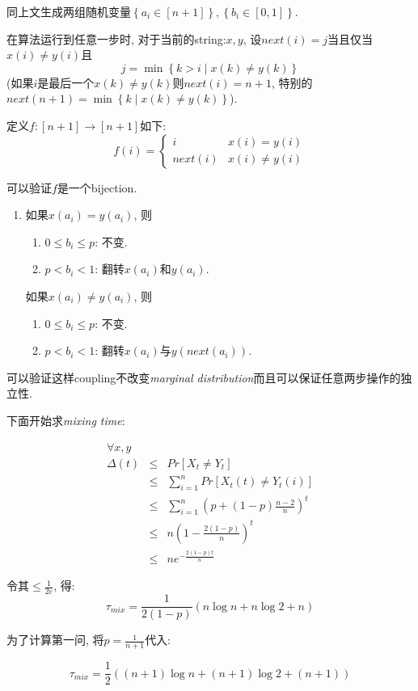 \documentclass[paper=a4, fontsize=11pt]{scrartcl} %
\numberwithin{figure}{section} %
\numberwithin{table}{section} %
\begin{document}
\begin{enumerate}[(a)]
	同上文生成两组随机变量$\left\{a_i\in [n+1]\right\}, \left\{b_i\in[0, 1]\right\}$.

	在算法运行到任意一步时, 对于当前的string:$x, y$, 设$\textit{next}(i)=j$当且仅当$x(i) \not= y(i)$且$$j = \min\left\{k>i\mid x(k)\not= y(k)\right\}$$(如果$i$是最后一个$x(k)\not=y(k)$则$\textit{next}(i)=n+1$, 特别的$next(n+1) = \min\left\{k\mid x(k)\not= y(k)\right\}$).

	定义$f:[n+1]\rightarrow [n+1]$如下:
	$$f(i) = \left\{
	\begin{array}{ll}
		i & x(i) = y(i) \\
		\textit{next}(i) & x(i) \not= y(i)
	\end{array}
	\right. $$
	
	可以验证$f$是一个bijection.

	\begin{enumerate}
		\item 
			如果$x(a_i)=y(a_i)$, 则
			\begin{enumerate}
				\item $0 \leq b_i \leq p$: 不变.
				\item $p < b_i < 1$: 翻转$x(a_i)$和$y(a_i)$.
			\end{enumerate}
			如果$x(a_i)\not=y(a_i)$, 则
			\begin{enumerate}
				\item $0 \leq b_i \leq p$: 不变.
				\item $p < b_i < 1$: 翻转$x(a_i)$与$y(next(a_i))$.
			\end{enumerate}
	\end{enumerate}

	可以验证这样coupling不改变\textit{marginal distribution}而且可以保证任意两步操作的独立性.

	下面开始求\textit{mixing time}:

	\begin{eqnarray*}
		\forall x, y & & \\
		\Delta(t) 	& \leq & \textit{Pr}\left[
			X_t\not= Y_t
		\right]	 \\ 
		& \leq & \sum_{i=1}^{n} \textit{Pr}\left[
			X_t(t)\not=Y_t(i)
		\right] \\
		& \leq & \sum_{i=1}^{n} \left(p + (1-p)\frac{n - 2}{n}\right)^t \\
		& \leq & n\left(1 - \frac{2(1-p)}{n}\right)^t \\
		& \leq & ne^{-\frac{2(1-p)t}{n}}
	\end{eqnarray*}

	令其$\leq \frac{1}{2e}$, 得:
	$$\tau_{mix} = \frac{1}{2(1-p)}\left(n\log n+ n\log 2 + n\right) $$

	为了计算第一问, 将$p = \frac{1}{n+1}$代入:

	$$\tau_{mix} = \frac{1}{2}\left((n+1)\log n + (n+1)\log 2 + (n+1)\right) $$
\end{enumerate}
	
\end{document}
